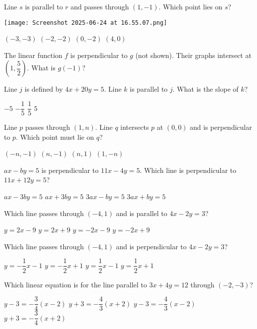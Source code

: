 \documentclass[12pt]{exam}
\begin{document}
\begin{questions}
\question Line $s$ is parallel to $r$ and passes through $(1,-1)$. Which point lies on $s$?
\begin{center}
\texttt{[image: Screenshot 2025-06-24 at 16.55.07.png]}
\end{center}
\begin{choices}
\choice $(-3,-3)$
\choice $(-2,-2)$
\choice $(0,-2)$
\choice $(4,0)$
\end{choices}

\question The linear function $f$ is perpendicular to $g$ (not shown). Their graphs intersect at $\left(1,\dfrac{5}{2}\right)$. What is $g(-1)$?

\question Line $j$ is defined by $4x + 20y = 5$. Line $k$ is parallel to $j$. What is the slope of $k$?
\begin{choices}
\choice $-5$
\choice $-\dfrac{1}{5}$
\choice $\dfrac{1}{5}$
\choice $5$
\end{choices}

\question Line $p$ passes through $(1,n)$. Line $q$ intersects $p$ at $(0,0)$ and is perpendicular to $p$. Which point must lie on $q$?
\begin{choices}
\choice $(-n,-1)$
\choice $(n,-1)$
\choice $(n,1)$
\choice $(1,-n)$
\end{choices}

\question $ax - by = 5$ is perpendicular to $11x - 4y = 5$. Which line is perpendicular to $11x + 12y = 5$?
\begin{choices}
\choice $ax - 3by = 5$
\choice $ax + 3by = 5$
\choice $3ax - by = 5$
\choice $3ax + by = 5$
\end{choices}

\question Which line passes through $(-4,1)$ and is parallel to $4x - 2y = 3$?
\begin{choices}
\choice $y = 2x - 9$
\choice $y = 2x + 9$
\choice $y = -2x - 9$
\choice $y = -2x + 9$
\end{choices}

\question Which line passes through $(-4,1)$ and is perpendicular to $4x - 2y = 3$?
\begin{choices}
\choice $y = -\dfrac{1}{2}x - 1$
\choice $y = -\dfrac{1}{2}x + 1$
\choice $y = \dfrac{1}{2}x - 1$
\choice $y = \dfrac{1}{2}x + 1$
\end{choices}

\question Which linear equation is for the line parallel to $3x + 4y = 12$ through $(-2,-3)$?
\begin{choices}
\choice $y - 3 = -\dfrac{3}{4}(x - 2)$
\choice $y + 3 = -\dfrac{4}{3}(x + 2)$
\choice $y - 3 = -\dfrac{4}{3}(x - 2)$
\choice $y + 3 = -\dfrac{3}{4}(x + 2)$
\end{choices}


\end{questions}
\end{document}
